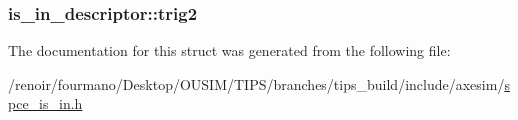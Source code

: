 \label{structis__in__descriptor_abc9206751643a78624d922bef124d5d4}
\hypertarget{structis__in__descriptor_a59780588f236998e85b24336f7b42e77}{
\subsubsection[{trig2}]{ {\bf is\_\-in\_\-descriptor::trig2}}}
\label{structis__in__descriptor_a59780588f236998e85b24336f7b42e77}


The documentation for this struct was generated from the following file:\begin{DoxyCompactItemize}
\item 
/renoir/fourmano/Desktop/OUSIM/TIPS/branches/tips\_\-build/include/axesim/\hyperlink{spce__is__in_8h}{spce\_\-is\_\-in.h}\end{DoxyCompactItemize}
